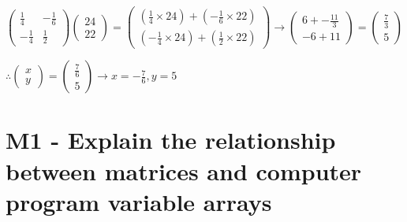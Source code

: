 \documentclass{article}
\begin{document}
\[
	\begin{pmatrix}
		\frac{1}{4} & -\frac{1}{6}\\
		-\frac{1}{4} & \frac{1}{2}
	\end{pmatrix}
	\begin{pmatrix}
		24\\
		22
	\end{pmatrix}

	=
	\begin{pmatrix}
		(\frac{1}{4}\times24)+(-\frac{1}{6}\times22)\\
		(-\frac{1}{4}\times24)+(\frac{1}{2}\times22)
	\end{pmatrix}
	\rightarrow
	\begin{pmatrix}
		6 + -\frac{11}{3}\\
		-6 + 11
	\end{pmatrix}
	=
	\begin{pmatrix}
		\frac{7}{3}\\
		5
	\end{pmatrix}
\]
\begin{center}\vspace{0.5cm}$\therefore
	\begin{pmatrix}
		x\\
		y
	\end{pmatrix}
	= 
	\begin{pmatrix}
		\frac{7}{6}\\
		5
	\end{pmatrix}
	\rightarrow
x = -\frac{7}{6}, y = 5$\end{center}
\section{M1 - Explain the relationship between matrices and computer program variable arrays}
\end{document}
